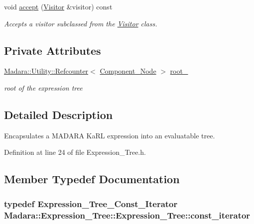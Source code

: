 \begin{DoxyCompactItemize}
void \hyperlink{classMadara_1_1Expression__Tree_1_1Expression__Tree_a3c24c73f0c6ebf814184d49684ac7ed2}{accept} (\hyperlink{classMadara_1_1Expression__Tree_1_1Visitor}{Visitor} \&visitor) const 
\begin{DoxyCompactList}\small\item\em Accepts a visitor subclassed from the \hyperlink{classMadara_1_1Expression__Tree_1_1Visitor}{Visitor} class. \item\end{DoxyCompactList}\end{DoxyCompactItemize}
\subsection*{Private Attributes}
\begin{DoxyCompactItemize}
\item 
\hyperlink{classMadara_1_1Utility_1_1Refcounter}{Madara::Utility::Refcounter}$<$ \hyperlink{classMadara_1_1Expression__Tree_1_1Component__Node}{Component\_\-Node} $>$ \hyperlink{classMadara_1_1Expression__Tree_1_1Expression__Tree_a9f38e8a0b9bfcbea1b4e3accf651da66}{root\_\-}
\begin{DoxyCompactList}\small\item\em root of the expression tree \item\end{DoxyCompactList}\end{DoxyCompactItemize}


\subsection{Detailed Description}
Encapsulates a MADARA KaRL expression into an evaluatable tree. 

Definition at line 24 of file Expression\_\-Tree.h.



\subsection{Member Typedef Documentation}
\hypertarget{classMadara_1_1Expression__Tree_1_1Expression__Tree_a8824934a03e87b54512cd7f09d301e43}{
\subsubsection[{const\_\-iterator}]{\setlength{\rightskip}{0pt plus 5cm}typedef {\bf Expression\_\-Tree\_\-Const\_\-Iterator} {\bf Madara::Expression\_\-Tree::Expression\_\-Tree::const\_\-iterator}}}
\label{da/d25/classMadara_1_1Expression__Tree_1_1Expression__Tree_a8824934a03e87b54512cd7f09d301e43}


